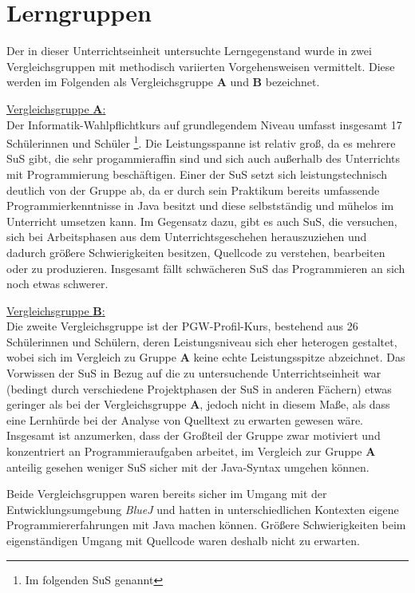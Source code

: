 \documentclass[paper=a4, DIV=13, BCOR=12mm, twoside=on, onecolumn=on, open = any, titlepage =on, parskip =half-, headsepline = on, footsepline = on, chapterprefix = on, sectionprefix = on, appendixprefix = off, fontsize = 12pt, numbers = noenddot, abstract = off]{scrreprt}
\begin{document}
\par \singlespacing
 \section{Lerngruppen}
\onehalfspacing
Der in dieser Unterrichtseinheit untersuchte Lerngegenstand wurde in zwei Vergleichsgruppen mit methodisch variierten Vorgehensweisen vermittelt. Diese werden im Folgenden als Vergleichsgruppe \textsc{\textbf{A}} und \textsc{\textbf{B}} bezeichnet.


\underline{Vergleichsgruppe \textsc{\textbf{A}}:}\\
Der Informatik-Wahlpflichtkurs auf grundlegendem Niveau umfasst insgesamt 17 Schülerinnen und Schüler \footnote{Im folgenden SuS genannt}. Die Leistungsspanne ist relativ groß, da es mehrere SuS gibt, die sehr progammieraffin sind und sich auch außerhalb des Unterrichts mit Programmierung beschäftigen. Einer der SuS setzt sich leistungstechnisch deutlich von der Gruppe ab, da er durch sein Praktikum bereits umfassende Programmierkenntnisse in Java besitzt und diese selbstständig und mühelos im Unterricht umsetzen kann. Im Gegensatz dazu, gibt es auch SuS, die versuchen, sich bei Arbeitsphasen aus dem Unterrichtsgeschehen herauszuziehen und dadurch größere Schwierigkeiten besitzen, Quellcode zu verstehen, bearbeiten oder zu produzieren. Insgesamt fällt schwächeren SuS das Programmieren an sich noch etwas schwerer.

\underline{Vergleichsgruppe \textsc{\textbf{B}}:}\\
Die zweite Vergleichsgruppe ist der PGW-Profil-Kurs, bestehend aus 26 Schülerinnen und Schülern, deren Leistungsniveau sich eher heterogen gestaltet, wobei sich im Vergleich zu Gruppe \textsc{\textbf{A}} keine echte Leistungsspitze abzeichnet. Das Vorwissen der SuS in Bezug auf die zu untersuchende Unterrichtseinheit war (bedingt durch verschiedene Projektphasen der SuS in anderen Fächern) etwas geringer als bei der Vergleichsgruppe \textsc{\textbf{A}}, jedoch nicht in diesem Maße, als dass eine Lernhürde bei der Analyse von Quelltext zu erwarten gewesen wäre. Insgesamt ist anzumerken, dass der Großteil der Gruppe zwar motiviert und konzentriert an Programmieraufgaben arbeitet, im Vergleich zur Gruppe \textsc{\textbf{A}} anteilig gesehen weniger SuS sicher mit der Java-Syntax umgehen können. 

Beide Vergleichsgruppen waren bereits sicher im Umgang mit der Entwicklungsumgebung \emph{BlueJ} und hatten in unterschiedlichen Kontexten eigene Programmiererfahrungen mit Java machen können. Größere Schwierigkeiten beim eigenständigen Umgang mit Quellcode waren deshalb nicht zu erwarten.
\end{document}
